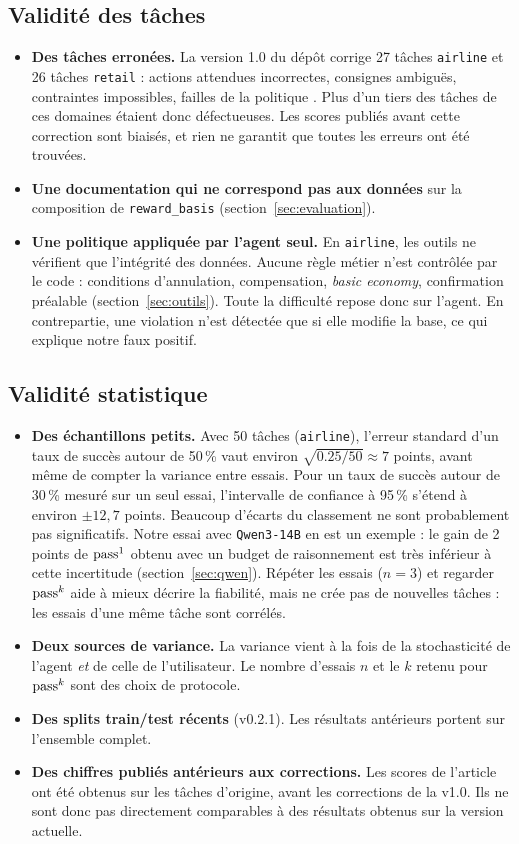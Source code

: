 \subsection{Validité des tâches}
\begin{itemize}
  \item \textbf{Des tâches erronées.} La version 1.0 du dépôt corrige 27 tâches \texttt{airline} et 26 tâches \texttt{retail} : actions attendues incorrectes, consignes ambiguës, contraintes impossibles, failles de la politique \cite{tau2repo}. Plus d'un tiers des tâches de ces domaines étaient donc défectueuses. Les scores publiés avant cette correction sont biaisés, et rien ne garantit que toutes les erreurs ont été trouvées.
  \item \textbf{Une documentation qui ne correspond pas aux données} sur la composition de \texttt{reward\_basis} (section~\ref{sec:evaluation}).
  \item \textbf{Une politique appliquée par l'agent seul.} En \texttt{airline}, les outils ne vérifient que l'intégrité des données. Aucune règle métier n'est contrôlée par le code : conditions d'annulation, compensation, \emph{basic economy}, confirmation préalable (section~\ref{sec:outils}). Toute la difficulté repose donc sur l'agent. En contrepartie, une violation n'est détectée que si elle modifie la base, ce qui explique notre faux positif.
\end{itemize}

\subsection{Validité statistique}
\begin{itemize}
  \item \textbf{Des échantillons petits.} Avec 50 tâches (\texttt{airline}), l'erreur standard d'un taux de succès autour de 50\,\% vaut environ $\sqrt{0.25/50} \approx 7$ points, avant même de compter la variance entre essais. Pour un taux de succès autour de 30\,\% mesuré sur un seul essai, l'intervalle de confiance à 95\,\% s'étend à environ $\pm 12{,}7$ points. Beaucoup d'écarts du classement ne sont probablement pas significatifs. Notre essai avec \texttt{Qwen3-14B} en est un exemple : le gain de 2 points de $\text{pass}^{1}$ obtenu avec un budget de raisonnement est très inférieur à cette incertitude (section~\ref{sec:qwen}). Répéter les essais ($n=3$) et regarder $\text{pass}^{k}$ aide à mieux décrire la fiabilité, mais ne crée pas de nouvelles tâches : les essais d'une même tâche sont corrélés.
  \item \textbf{Deux sources de variance.} La variance vient à la fois de la stochasticité de l'agent \emph{et} de celle de l'utilisateur. Le nombre d'essais $n$ et le $k$ retenu pour $\text{pass}^{k}$ sont des choix de protocole.
  \item \textbf{Des splits train/test récents} (v0.2.1). Les résultats antérieurs portent sur l'ensemble complet.
  \item \textbf{Des chiffres publiés antérieurs aux corrections.} Les scores de l'article ont été obtenus sur les tâches d'origine, avant les corrections de la v1.0. Ils ne sont donc pas directement comparables à des résultats obtenus sur la version actuelle.
\end{itemize}

